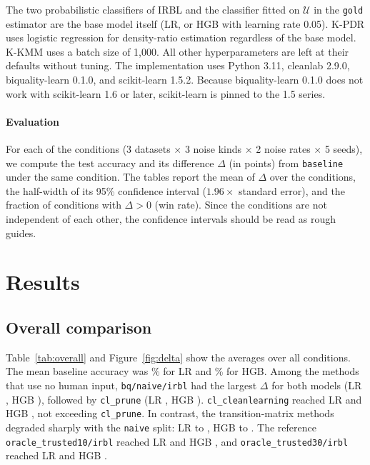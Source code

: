 \documentclass[a4paper,10pt]{article}
\newcommand{\method}[1]{\texttt{#1}}
\newcommand{\cl}{\textsf{cleanlab}}
\newcommand{\bq}{\textsf{biquality-learn}}
\begin{document}
The two probabilistic classifiers of IRBL and the classifier fitted on $\mathcal{U}$ in the \texttt{gold} estimator are the base model itself (LR, or HGB with learning rate 0.05).
K-PDR uses logistic regression for density-ratio estimation regardless of the base model.
K-KMM uses a batch size of 1,000.
All other hyperparameters are left at their defaults without tuning.
The implementation uses Python 3.11, \cl{} 2.9.0, \bq{} 0.1.0, and scikit-learn 1.5.2.
Because \bq{} 0.1.0 does not work with scikit-learn 1.6 or later, scikit-learn is pinned to the 1.5 series.

\paragraph{Evaluation}
For each of the \NCond{} conditions (3 datasets $\times$ 3 noise kinds $\times$ 2 noise rates $\times$ 5 seeds), we compute the test accuracy and its difference $\Delta$ (in points) from \method{baseline} under the same condition.
The tables report the mean of $\Delta$ over the \NCond{} conditions, the half-width of its 95\% confidence interval ($1.96 \times$ standard error), and the fraction of conditions with $\Delta > 0$ (win rate).
Since the conditions are not independent of each other, the confidence intervals should be read as rough guides.

\section{Results}

\subsection{Overall comparison}

Table~\ref{tab:overall} and Figure~\ref{fig:delta} show the averages over all conditions.
The mean baseline accuracy was \AccLRBaseline\% for LR and \AccHGBBaseline\% for HGB.
Among the methods that use no human input, \method{bq/naive/irbl} had the largest $\Delta$ for both models (LR \DLRNaiveIRBL{}, HGB \DHGBNaiveIRBL{}), followed by \method{cl\_prune} (LR \DLRPrune{}, HGB \DHGBPrune{}).
\method{cl\_cleanlearning} reached LR \DLRCleanLearning{} and HGB \DHGBCleanLearning{}, not exceeding \method{cl\_prune}.
In contrast, the transition-matrix methods degraded sharply with the \method{naive} split: LR \DLRNaiveGLC{} to \DLRNaivePlugin{}, HGB \DHGBNaiveIRLNL{} to \DHGBNaivePlugin{}.
The reference \method{oracle\_trusted10/irbl} reached LR \DLROracleTen{} and HGB \DHGBOracleTen{}, and \method{oracle\_trusted30/irbl} reached LR \DLROracleThirty{} and HGB \DHGBOracleThirty{}.
\end{document}
